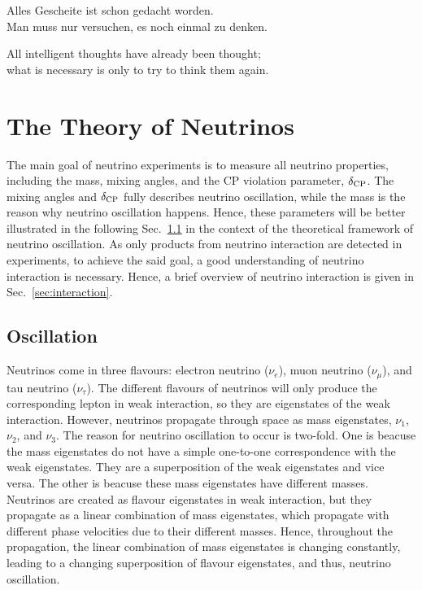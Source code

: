 \begin{savequote}[8cm]
Alles Gescheite ist schon gedacht worden.\\
Man muss nur versuchen, es noch einmal zu denken.

All intelligent thoughts have already been thought;\\
what is necessary is only to try to think them again.

\end{savequote}

\chapter{\label{ch:nu-theo}The Theory of Neutrinos}
\minitoc
The main goal of neutrino experiments is to measure all neutrino properties, including the mass, mixing angles, and the CP violation parameter, $\delta_\textrm{CP}$. 
The mixing angles and $\delta_\textrm{CP}$ fully describes neutrino oscillation, while the mass is the reason why neutrino oscillation happens.
Hence, these parameters will be better illustrated in the following Sec.~\ref{sec:oscillation} in the context of the theoretical framework of neutrino oscillation.
As only products from neutrino interaction are detected in experiments, to achieve the said goal, a good understanding of neutrino interaction is necessary.
Hence, a brief overview of neutrino interaction is given in Sec.~\ref{sec:interaction}.

\section{Oscillation}
\label{sec:oscillation}
Neutrinos come in three flavours: electron neutrino ($\nu_e$), muon neutrino ($\nu_\mu$), and tau neutrino ($\nu_\tau$).
The different flavours of neutrinos will only produce the corresponding lepton in weak interaction, so they are eigenstates of the weak interaction.
However, neutrinos propagate through space as mass eigenstates, $\nu_1$, $\nu_2$, and $\nu_3$.
The reason for neutrino oscillation to occur is two-fold.
One is beacuse the mass eigenstates do not have a simple one-to-one correspondence with the weak eigenstates. 
They are a superposition of the weak eigenstates and vice versa.
The other is beacuse these mass eigenstates have different masses.
Neutrinos are created as flavour eigenstates in weak interaction, but they propagate as a linear combination of mass eigenstates, which propagate with different phase velocities due to their different masses.
Hence, throughout the propagation, the linear combination of mass eigenstates is changing constantly, leading to a changing superposition of flavour eigenstates, and thus, neutrino oscillation.

